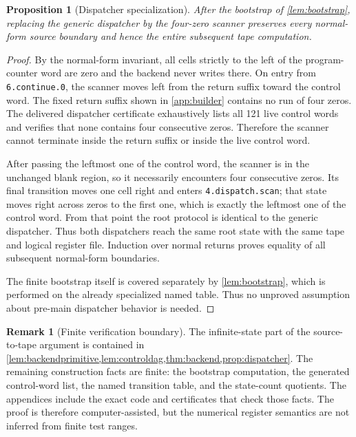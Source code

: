 \documentclass[10pt]{article}
\newtheorem{proposition}[theorem]{Proposition}
\theoremstyle{definition}
\newtheorem{remark}[theorem]{Remark}
\begin{document}
\begin{proposition}[Dispatcher specialization]
\label{prop:dispatcher}
After the bootstrap of \cref{lem:bootstrap}, replacing the generic dispatcher
by the four-zero scanner preserves every normal-form source boundary and hence
the entire subsequent tape computation.
\end{proposition}

\begin{proof}
By the normal-form invariant, all cells strictly to the left of the
program-counter word are zero and the backend never writes there.
On entry from \texttt{6.continue.0}, the scanner moves left from the return
suffix toward the control word.  The fixed return suffix shown in
\cref{app:builder} contains no run of four zeros.  The delivered dispatcher
certificate exhaustively lists all 121 live control words and verifies that
none contains four consecutive zeros.  Therefore the scanner cannot terminate
inside the return suffix or inside the live control word.

After passing the leftmost one of the control word, the scanner is in the
unchanged blank region, so it necessarily encounters four consecutive zeros.
Its final transition moves one cell right and enters
\texttt{4.dispatch.scan}; that state moves right across zeros to the first
one, which is exactly the leftmost one of the control word.  From that point
the root protocol is identical to the generic dispatcher.  Thus both
dispatchers reach the same root state with the same tape and logical register
file.  Induction over normal returns proves equality of all subsequent
normal-form boundaries.

The finite bootstrap itself is covered separately by
\cref{lem:bootstrap}, which is performed on the already specialized named
table.  Thus no unproved assumption about pre-main dispatcher behavior is
needed.
\end{proof}

\begin{remark}[Finite verification boundary]
The infinite-state part of the source-to-tape argument is contained in
\cref{lem:backendprimitive,lem:controldag,thm:backend,prop:dispatcher}.
The remaining construction facts are finite: the bootstrap computation, the
generated control-word list, the named transition table, and the state-count
quotients.  The appendices include the exact code and certificates that check
those facts.  The proof is therefore computer-assisted, but the numerical
register semantics are not inferred from finite test ranges.
\end{remark}
\end{document}

